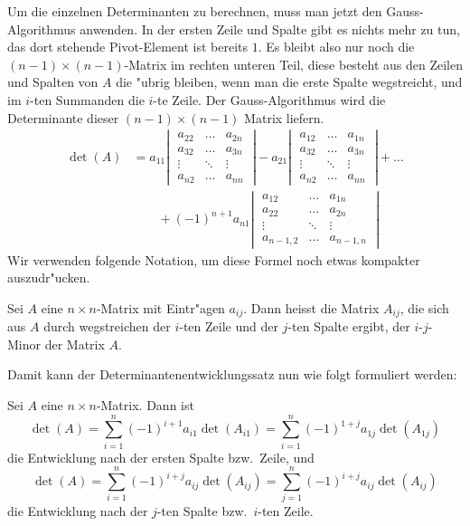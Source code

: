 Um die einzelnen Determinanten zu berechnen, muss man jetzt 
den Gauss-Algorithmus anwenden. In der ersten Zeile und Spalte
gibt es nichts mehr zu tun, das dort stehende Pivot-Element ist
bereits $1$. Es bleibt also nur noch die $(n-1)\times(n-1)$-Matrix
im rechten unteren Teil, diese besteht aus den Zeilen und Spalten
von $A$ die "ubrig bleiben, wenn man die erste Spalte wegstreicht,
und im $i$-ten Summanden die $i$-te Zeile. Der Gauss-Algorithmus wird
die Determinante dieser $(n-1)\times(n-1)$ Matrix liefern.
\begin{align*}
\det(A)
&=
a_{11}
\left|\;
\begin{matrix}
a_{22}&\dots&a_{2n}\\
a_{32}&\dots&a_{3n}\\
\vdots&\ddots&\vdots\\
a_{n2}&\dots&a_{nn}
\end{matrix}
\;\right|
-a_{21}
\left|\;
\begin{matrix}
a_{12}&\dots&a_{1n}\\
a_{32}&\dots&a_{3n}\\
\vdots&\ddots&\vdots\\
a_{n2}&\dots&a_{nn}
\end{matrix}
\;\right|
+\dots
\\
&\qquad
+(-1)^{n+1}a_{n1}
\left|\;
\begin{matrix}
a_{12}&\dots&a_{1n}\\
a_{22}&\dots&a_{2n}\\
\vdots&\ddots&\vdots\\
a_{n-1,2}&\dots&a_{n-1,n}
\end{matrix}
\;\right|
\end{align*}
Wir verwenden folgende Notation, um diese Formel noch etwas kompakter
auszudr"ucken.
\begin{definition}Sei $A$ eine $n\times n$-Matrix mit Eintr"agen $a_{ij}$.
Dann heisst die Matrix $A_{ij}$, die sich aus $A$ durch wegstreichen
der $i$-ten Zeile und der $j$-ten Spalte ergibt, der $i$-$j$-Minor der
Matrix $A$.
\end{definition}
Damit kann der Determinantenentwicklungssatz nun wie folgt formuliert
werden:
\begin{satz}
Sei $A$ eine $n\times n$-Matrix. Dann ist
\[
\det(A)=
\sum_{i=1}^n(-1)^{i+1}a_{i1}\det(A_{i1})
=
\sum_{i=1}^n(-1)^{1+j}a_{1j}\det(A_{1j})
\]
die Entwicklung nach der ersten Spalte bzw.~Zeile, und 
\[
\det(A)=
\sum_{i=1}^n(-1)^{i+j}a_{ij}\det(A_{ij})
=
\sum_{j=1}^n(-1)^{i+j}a_{ij}\det(A_{ij})
\]
die Entwicklung nach der $j$-ten Spalte bzw.~$i$-ten Zeile. 
\end{satz}

